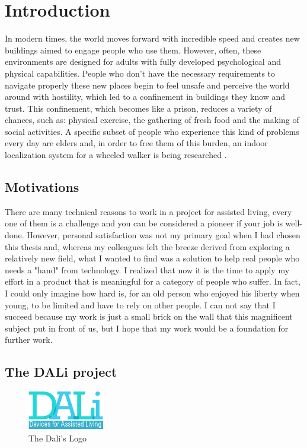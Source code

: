 \chapter{Introduction}
In modern times, the world moves forward with incredible speed and creates new buildings aimed to engage people who use them.
However, often, these environments are designed for adults with fully developed psychological and physical capabilities.
People who don't have the necessary requirements to navigate properly these new places begin to feel unsafe and perceive the world around with hostility, which led to a confinement in buildings they know and trust.
This confinement, which becomes like a prison, reduces a variety of chances, such as: physical exercise, the gathering of fresh food and the making of social activities.
A specific subset of people who experience this kind of problems every day are elders and, in order to free them of this burden, an indoor localization system for a wheeled walker is being researched . 

\section{Motivations}

There are many technical reasons to work in a project for assisted living, every one of them is a challenge and you can be considered a pioneer if your job is well-done.
However, personal satisfaction was not my primary goal when I had chosen this thesis and, whereas my colleagues felt the breeze derived from exploring a relatively new field, what I wanted to find was a solution to help real people who needs a "hand" from technology.
I realized that now it is the time to apply my effort in a product that is meaningful for a category of people who suffer. 
In fact, I could only imagine how hard is, for an old person who enjoyed his liberty when young, to be limited and have to rely on other people.
I can not say that I succeed because my work is just a small brick on the wall that this magnificent subject put in front of us, but I hope that my work would be a foundation for further work.

\section{The DALi project}

\vspace{1cm}
\begin{figure}[hbt]
	  \centering
      \includegraphics[width=0.3\textwidth]{img/Dali-logo.png}
      \caption{The Dali's Logo}
\end{figure}
\vspace{1cm}

